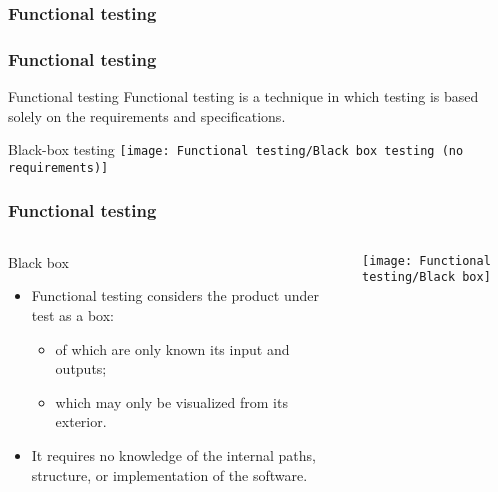 \begin{frame}[c,parent={cmap:software-testing}, hasprev=false, hasnext=false]
\frametitle{Functional testing}
\label{cmap:functional-testing}

\end{frame}



\begin{frame}[parent={cmap:functional-testing}, hasprev=false, hasnext=true]
\frametitle{Functional testing}
\label{concept:functional-testing}

\begin{block:concept}{Functional testing}
Functional testing is a technique in which testing is based solely on the
requirements and specifications.
\end{block:concept}

\begin{block:fact}{Black-box testing}
	\centering
	\texttt{[image: Functional testing/Black box testing (no requirements)]}
\end{block:fact}
\end{frame}


\begin{frame}[hasprev=true, hasnext=true]
\frametitle{Functional testing}
\label{concept:black-box}

\begin{columns}[t]
\begin{block:fact}{Black box}
\begin{itemize}
	\item Functional testing considers the product under test as a box:
	\begin{itemize}
		\item of which are only known its input and outputs;

		\item which may only be visualized from its exterior.
	\end{itemize}

	\item It requires no knowledge of the internal paths, structure, or
	implementation of the software.
\end{itemize}
\end{block:fact}

\texttt{[image: Functional testing/Black box]}
\end{columns}
\end{frame}



